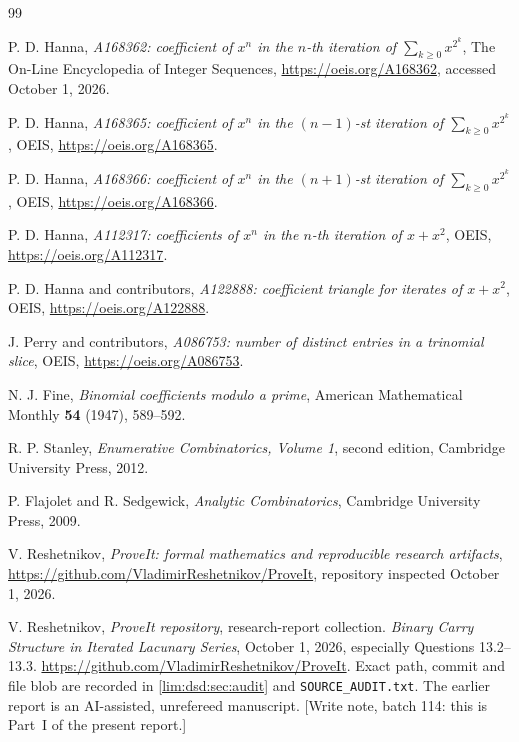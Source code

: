 \documentclass[11pt]{article}
\theoremstyle{definition}
\theoremstyle{remark}
\begin{document}
\begin{thebibliography}{99}

P. D. Hanna,
\emph{A168362: coefficient of $x^n$ in the $n$-th iteration of
$\sum_{k\ge0}x^{2^k}$},
The On-Line Encyclopedia of Integer Sequences,
\url{https://oeis.org/A168362}, accessed October 1, 2026.

P. D. Hanna,
\emph{A168365: coefficient of $x^n$ in the $(n-1)$-st iteration of
$\sum_{k\ge0}x^{2^k}$},
OEIS, \url{https://oeis.org/A168365}.

P. D. Hanna,
\emph{A168366: coefficient of $x^n$ in the $(n+1)$-st iteration of
$\sum_{k\ge0}x^{2^k}$},
OEIS, \url{https://oeis.org/A168366}.

P. D. Hanna,
\emph{A112317: coefficients of $x^n$ in the $n$-th iteration of $x+x^2$},
OEIS, \url{https://oeis.org/A112317}.

P. D. Hanna and contributors,
\emph{A122888: coefficient triangle for iterates of $x+x^2$},
OEIS, \url{https://oeis.org/A122888}.

J. Perry and contributors,
\emph{A086753: number of distinct entries in a trinomial slice},
OEIS, \url{https://oeis.org/A086753}.

N. J. Fine,
\emph{Binomial coefficients modulo a prime},
American Mathematical Monthly \textbf{54} (1947), 589--592.

R. P. Stanley,
\emph{Enumerative Combinatorics, Volume 1}, second edition,
Cambridge University Press, 2012.

P. Flajolet and R. Sedgewick,
\emph{Analytic Combinatorics},
Cambridge University Press, 2009.

V. Reshetnikov,
\emph{ProveIt: formal mathematics and reproducible research artifacts},
\url{https://github.com/VladimirReshetnikov/ProveIt},
repository inspected October 1, 2026.

V. Reshetnikov, \emph{ProveIt repository}, research-report collection.
\emph{Binary Carry Structure in Iterated Lacunary Series},
October 1, 2026, especially Questions 13.2--13.3.
\url{https://github.com/VladimirReshetnikov/ProveIt}.
Exact path, commit and file blob are recorded in \cref{lim:dsd:sec:audit}
and \texttt{SOURCE\_AUDIT.txt}. The earlier report is an
AI-assisted, unrefereed manuscript.
[Write note, batch 114: this is Part~I of the present report.]


\end{thebibliography}
\end{document}
